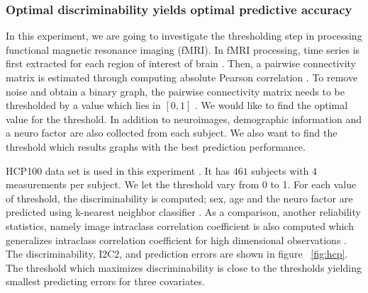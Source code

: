 \documentclass{article}
\begin{document}
\subsubsection{Optimal discriminability yields optimal predictive accuracy}
In this experiment, we are going to investigate the thresholding step in processing functional magnetic resonance imaging (fMRI). In fMRI processing, time series is first extracted for each region of interest of brain \cite{strother2006evaluating}. Then, a pairwise connectivity matrix is estimated through computing absolute Pearson correlation \cite{liang2012effects}. To remove noise and obtain a binary graph, the pairwise connectivity matrix needs to be thresholded by a value which lies in $[0,1]$ \cite{hampson2002detection}\cite{van2010exploring}. We would like to find the optimal value for the threshold. In addition to neuroimages, demographic information and a neuro factor \cite{costa1992revised} are also collected from each subject. We also want to find the threshold which results graphs with the best prediction performance.  

HCP100 data set is used in this experiment \cite{van2012human}. It has $461$ subjects with $4$ measurements per subject. We let the threshold vary from 0 to 1. For each value of threshold, the discriminability is computed; sex, age and the neuro factor are predicted using k-nearest neighbor classifier \cite{vapnik1998statistical}. As a comparison, another reliability statistics, namely image intraclass correlation coefficient is also computed which generalizes intraclass correlation coefficient for high dimensional observations \cite{shou2013quantifying}. The discriminability, I2C2, and prediction errors are shown in figure ~\ref{fig:hcp}. The threshold which maximizes discriminability is close to the thresholds yielding smallest predicting errors for three covariates. 
\end{document}
